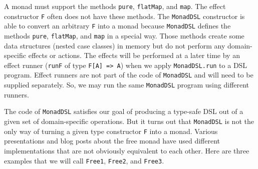 A monad must support the methods \lstinline!pure!,
\lstinline!flatMap!, and
\lstinline!map!. The effect
constructor \lstinline!F!
often does not have these methods. The \lstinline!MonadDSL!
constructor is able to convert an arbitrary \lstinline!F!
into a monad because \lstinline!MonadDSL!
defines the methods \lstinline!pure!,
\lstinline!flatMap!, and
\lstinline!map! in a special
way. Those methods create some data structures (nested case classes)
in memory but do not perform any domain-specific effects or actions.
The effects will be performed at a later time by an effect runner
(\lstinline!runF! of type
\lstinline!F[A] => A!)
when we apply \lstinline!MonadDSL.run!
to a DSL program. Effect runners are not part of the code of \lstinline!MonadDSL!
and will need to be supplied separately. So, we may run the same \lstinline!MonadDSL!
program using different runners.

The code of \lstinline!MonadDSL!
satisfies our goal of producing a type-safe DSL out of a given set
of domain-specific operations. But it turns out that \lstinline!MonadDSL!
is not the only way of turning a given type constructor \lstinline!F!
into a monad. Various presentations and blog posts about the free
monad have used different implementations that are not obviously equivalent
to each other. Here are three examples that we will call \lstinline!Free1!,
\lstinline!Free2!, and
\lstinline!Free3!. 

